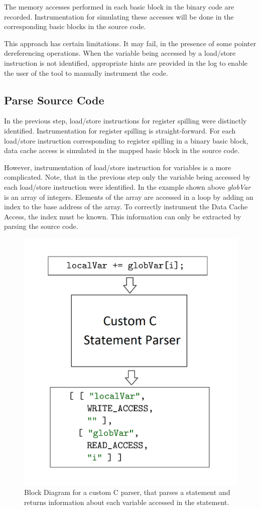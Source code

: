 The memory accesses performed in each basic block in the binary code are recorded. Instrumentation for simulating these accesses will be done in the corresponding basic blocks in the source code. 

This approach has certain limitations. It may fail, in the presence of some pointer dereferencing operations. When the variable being accessed by a load/store instruction is not identified, appropriate hints are provided in the log to enable the user of the tool to manually instrument the code.

\subsection{Parse Source Code}
In the previous step, load/store instructions for register spilling were distinctly identified. Instrumentation for register spilling is straight-forward. For each load/store instruction corresponding to register spilling in a binary basic block, data cache access is simulated in the mapped basic block in the source code.

However, instrumentation of load/store instruction for variables is a more complicated. Note, that in the previous step only the variable being accessed by each load/store instruction were identified. In the example shown above \emph{globVar} is an array of integers. Elements of the array are accessed in a loop by adding an index to the base address of the array. To correctly instrument the Data Cache Access, the index must be known. This information can only be extracted by parsing the source code.

\begin{figure}[h]
\centering
\includegraphics[width=.5\textwidth]{figures/cParser.png}
\caption{Block Diagram for a custom C parser, that parses a statement and returns information about each variable accessed in the statement.}
\label{fig:customCParser}
\end{figure}


